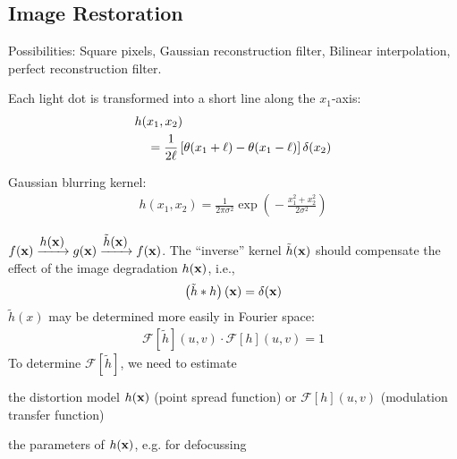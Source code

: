 \begin{compactdesc}
\section{Image Restoration}
	\item[\lp{Pixelization}]
		Possibilities: Square pixels, Gaussian reconstruction filter, Bilinear interpolation, perfect reconstruction filter.
	\item[\lp{Motion blurring}] Each light dot is transformed into a short line along the $x_1$-axis:
		\begin{align*}\scriptscriptstyle
			&h(x_1,x_2)\\
			&\quad=\frac{1}{2\ell}\left[ \theta(x_1+\ell)-\theta(x_1-\ell) \right]\delta(x_2)
		\end{align*}
	\item[\lp{Noise}] Gaussian blurring kernel:
		\begin{gather*}\scriptscriptstyle
			h(x_1,x_2)=\frac{1}{2\pi\sigma^2}\exp\!\left(\!\! -\frac{x_{1}^{2}+x_{2}^{2}}{2\sigma^2}\!\! \right)\!
		\end{gather*}
	\item[\lp{Problem}] $f(\bm{\mathrm{x}})\xrightarrow{\displaystyle h(\bm{\mathrm{x}})}g(\bm{\mathrm{x}})\xrightarrow{\displaystyle\tilde{h}(\bm{\mathrm{x}})}f(\bm{\mathrm{x}})$. The ``inverse'' kernel $\tilde{h}(\bm{\mathrm{x}})$ should compensate the effect of  the image degradation $h(\bm{\mathrm{x}})$, i.e.,
		\begin{gather*}
			\left( \tilde{h}*h \right)(\bm{\mathrm{x}})=\delta(\bm{\mathrm{x}})
		\end{gather*}
		$\tilde{h}(x)$ may be determined more easily in Fourier space:
		\begin{gather*}
			\mathcal{F}\!\left[ \tilde{h} \right]\!(u,v)\cdot\mathcal{F}[h](u,v)=1
		\end{gather*}
		To determine $\mathcal{F}\!\left[ \tilde{h} \right]\!$, we need to estimate\hfill\\
		\begin{enumerate*}[label=\protect\circled{\arabic*},itemjoin=]
			\item the distortion model $h(\bm{\mathrm{x}})$ (point spread function) or $\mathcal{F}[h](u,v)$ (modulation transfer function)\\
			\item the parameters of $h(\bm{\mathrm{x}})$, e.g. for defocussing\\
		\end{enumerate*}
	\item[\lp{Motion Blur FT}]
		\begin{sideways}
			\begin{minipage}[t]{1.3\columnwidth}

\end{minipage}
\end{sideways}
\end{compactdesc}
